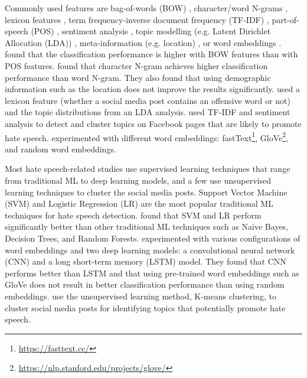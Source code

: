 %
Commonly used features are bag-of-words (BOW) \citep{greevy2004classifying}, character/word N-grams \citep{waseem2016hateful}, lexicon features \citep{xiang2012detecting},  term frequency-inverse document frequency (TF-IDF) \citep{badjatiya2017deep, davidson2017automated, rodriguez2019automatic}, part-of-speech (POS) \citep{greevy2004classifying}, sentiment analysis \citep{rodriguez2019automatic}, topic modelling (e.g. Latent Dirichlet Allocation (LDA)) \citep{xiang2012detecting}, meta-information (e.g. location) \citep{waseem2016hateful}, or word embeddings \citep{badjatiya2017deep, agrawal2018deep}.
%
\citet{greevy2004classifying} found that the classification performance is higher with BOW features than with POS features.
%
\citet{waseem2016hateful} found that character N-gram achieves higher classification performance than word N-gram.
%
They also found that using demographic information such as the location does not improve the results significantly.
%
\citet{xiang2012detecting} used a lexicon feature (whether a social media post contains an offensive word or not) and the topic distributions from an LDA analysis.
%
\citet{rodriguez2019automatic} used TF-IDF and sentiment analysis to detect and cluster topics on Facebook pages that are likely to promote hate speech.
%
\citet{badjatiya2017deep} experimented with different word embeddings: fastText\footnote{\url{https://fasttext.cc/}}, GloVe\footnote{\url{https://nlp.stanford.edu/projects/glove/}}, and random word embeddings.
%

Most hate speech-related studies use supervised learning techniques that range from traditional ML to deep learning models, and a few use unsupervised learning techniques to cluster the social media posts.
%
Support Vector Machine (SVM) \citep{greevy2004classifying, xiang2012detecting,davidson2017automated} and Logistic Regression (LR) \citep{waseem2016hateful, davidson2017automated} are the most popular traditional ML techniques for hate speech detection.
%
\citet{davidson2017automated} found that SVM and LR perform significantly better than other traditional ML techniques such as Naive Bayes, Decision Trees, and Random Forests.
%
\citet{badjatiya2017deep} experimented with various configurations of word embeddings and two deep learning models: a convolutional neural network (CNN) and a long short-term memory (LSTM) model.
%
They found that CNN performs better than LSTM and that using pre-trained word embeddings such as GloVe does not result in better classification performance than using random embeddings.
%
\citet{rodriguez2019automatic} use the unsupervised learning method, K-means clustering, to cluster social media posts for identifying topics that potentially promote hate speech.
%

